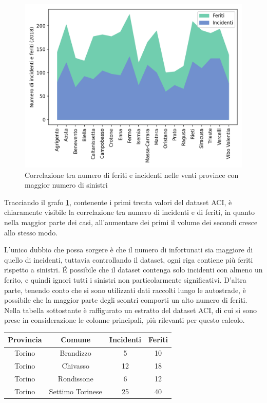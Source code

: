\documentclass[a4paper,12pt]{report}
\begin{document}
\begin{figure}
    \includegraphics[width=\linewidth]{../src/incidenti/incidenti_aci/provincia/corr_incidenti.png}
    \caption{Correlazione tra numero di feriti e incidenti nelle venti province con maggior numero di sinistri}
    \label{fig:corr-incidenti-feriti}
\end{figure}

Tracciando il grafo \ref{fig:corr-incidenti-feriti}, contenente i primi trenta valori 
del dataset ACI, è chiaramente visibile la correlazione tra 
numero di incidenti e di feriti, in quanto nella maggior parte dei casi, 
all'aumentare dei primi il volume dei secondi cresce allo stesso modo.

L'unico dubbio che possa sorgere è che il numero di infortunati sia maggiore di quello 
di incidenti, tuttavia controllando il dataset, ogni 
riga contiene più feriti rispetto a sinistri.
\'E possibile che il dataset contenga solo incidenti con almeno un ferito, 
e quindi ignori tutti i sinistri non particolarmente significativi.
D'altra parte, tenendo conto che si sono utilizzati dati raccolti lungo 
le autostrade, è possibile che la maggior parte degli scontri comporti 
un alto numero di feriti. 
Nella tabella sottostante è raffigurato un estratto del dataset ACI, 
di cui si sono prese in considerazione le colonne principali, più 
rilevanti per questo calcolo. 

\begin{center}
    \def\arraystretch{1.5}%
    \begin{tabular}{ |c|c|c|c| } 
    \hline
    Provincia & Comune & Incidenti & Feriti \\ 
    \hline
    \rowcolor{TableGray}
    Torino & Brandizzo & 5 & 10\\
    Torino & Chivasso & 12 & 18\\
    \rowcolor{TableGray}
    Torino & Rondissone & 6 & 12\\
    Torino & Settimo Torinese & 25 & 40\\
    \hline
    \end{tabular}
\end{center}
\end{document}
